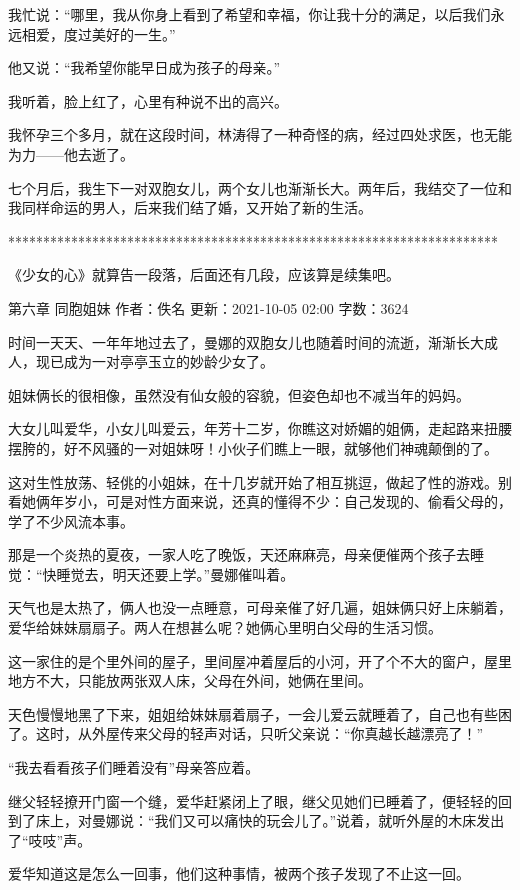 \documentclass[12pt,UTF8]{ctexbook}
\begin{document}
我忙说：“哪里，我从你身上看到了希望和幸福，你让我十分的满足，以后我们永远相爱，度过美好的一生。”

他又说：“我希望你能早日成为孩子的母亲。”

我听着，脸上红了，心里有种说不出的高兴。



我怀孕三个多月，就在这段时间，林涛得了一种奇怪的病，经过四处求医，也无能为力——他去逝了。

七个月后，我生下一对双胞女儿，两个女儿也渐渐长大。两年后，我结交了一位和我同样命运的男人，后来我们结了婚，又开始了新的生活。

**********************************************************************

《少女的心》就算告一段落，后面还有几段，应该算是续集吧。

第六章 同胞姐妹
作者：佚名      更新：2021-10-05 02:00      字数：3624

时间一天天、一年年地过去了，曼娜的双胞女儿也随着时间的流逝，渐渐长大成人，现已成为一对亭亭玉立的妙龄少女了。

姐妹俩长的很相像，虽然没有仙女般的容貌，但姿色却也不减当年的妈妈。

大女儿叫爱华，小女儿叫爱云，年芳十二岁，你瞧这对娇媚的姐俩，走起路来扭腰摆胯的，好不风骚的一对姐妹呀！小伙子们瞧上一眼，就够他们神魂颠倒的了。

这对生性放荡、轻佻的小姐妹，在十几岁就开始了相互挑逗，做起了性的游戏。别看她俩年岁小，可是对性方面来说，还真的懂得不少：自己发现的、偷看父母的，学了不少风流本事。

那是一个炎热的夏夜，一家人吃了晚饭，天还麻麻亮，母亲便催两个孩子去睡觉：“快睡觉去，明天还要上学。”曼娜催叫着。

天气也是太热了，俩人也没一点睡意，可母亲催了好几遍，姐妹俩只好上床躺着，爱华给妹妹扇扇子。两人在想甚么呢？她俩心里明白父母的生活习惯。

这一家住的是个里外间的屋子，里间屋冲着屋后的小河，开了个不大的窗户，屋里地方不大，只能放两张双人床，父母在外间，她俩在里间。

天色慢慢地黑了下来，姐姐给妹妹扇着扇子，一会儿爱云就睡着了，自己也有些困了。这时，从外屋传来父母的轻声对话，只听父亲说：“你真越长越漂亮了！”

“我去看看孩子们睡着没有”母亲答应着。

继父轻轻撩开门窗一个缝，爱华赶紧闭上了眼，继父见她们已睡着了，便轻轻的回到了床上，对曼娜说：“我们又可以痛快的玩会儿了。”说着，就听外屋的木床发出了“吱吱”声。

爱华知道这是怎么一回事，他们这种事情，被两个孩子发现了不止这一回。
\end{document}
